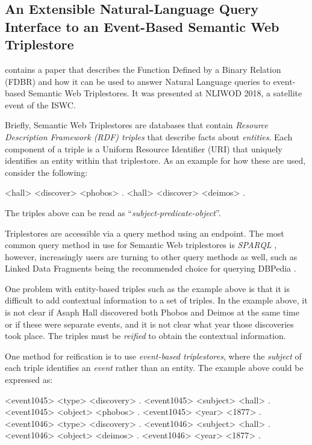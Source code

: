 \documentclass[../main.tex]{subfiles}
\begin{document}
\begin{refsection}
\section{An Extensible Natural-Language Query Interface to an Event-Based Semantic Web Triplestore}

\textbf{} contains a paper that describes the Function Defined by a Binary Relation (FDBR) and how it can be used to answer Natural Language queries to event-based Semantic Web Triplestores.  It was presented at NLIWOD 2018, a satellite event of the ISWC.

Briefly, Semantic Web Triplestores are databases that contain \textit{Resource Description Framework (RDF) triples} that describe facts about \textit{entities}.  Each component of a triple is a Uniform Resource Identifier (URI) that uniquely identifies an entity within that triplestore.  As an example for how these are used, consider the following:

\begin{code}
    <hall> <discover> <phobos> .
    <hall> <discover> <deimos> .
\end{code}

The triples above can be read as ``\textit{subject-predicate-object}''.

Triplestores are accessible via a query method using an endpoint.  The most common query method in use for Semantic Web triplestores is \textit{SPARQL} \cite{sparql}, however, increasingly users are turning to other query methods as well, such as Linked Data Fragments \cite{verborgh2014web} being the recommended choice for querying DBPedia \cite{dbpedia}.

One problem with entity-based triples such as the example above is that it is difficult to add contextual information to a set of triples.  In the example above, it is not clear if Asaph Hall discovered both Phobos and Deimos at the same time or if these were separate events, and it is not clear what year those discoveries took place.  The triples must be \textit{reified} \cite{antoniou2004semantic} to obtain the contextual information.

One method for reification is to use \textit{event-based triplestores}, where the \textit{subject} of each triple identifies an \textit{event} rather than an entity.  The example above could be expressed as:

\begin{code}
    <event1045> <type> <discovery> .
    <event1045> <subject> <hall> .
    <event1045> <object> <phobos> .
    <event1045> <year> <1877> .
    <event1046> <type> <discovery> .
    <event1046> <subject> <hall> .
    <event1046> <object> <deimos> .
    <event1046> <year> <1877> .
\end{code}


\end{refsection}
\end{document}
